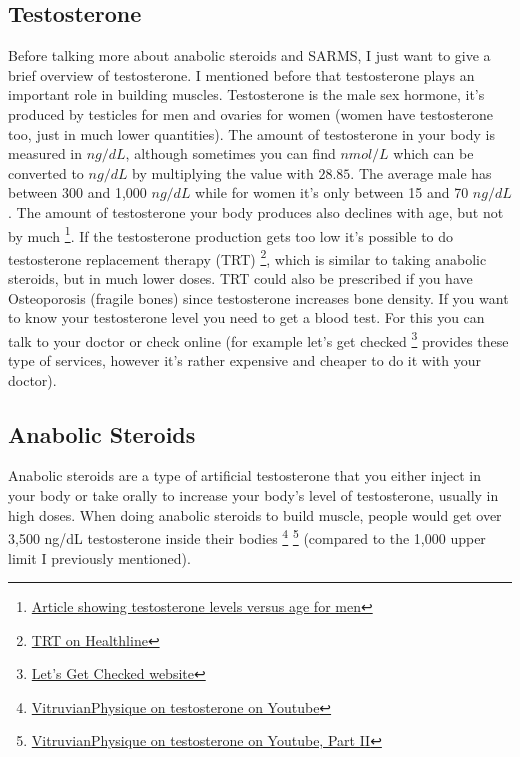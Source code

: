 \documentclass[openany, 12pt]{book}
\begin{document}
        \subsection{Testosterone}
        
        Before talking more about anabolic steroids and SARMS, I just want to give a brief overview of testosterone. I mentioned before that testosterone plays an important role in building muscles.
        Testosterone is the male sex hormone, it's produced by testicles for men and ovaries for women (women have testosterone too, just in much lower quantities).
        The amount of testosterone in your body is measured in $ng/dL$, although sometimes you can find $nmol/L$ which can be converted to $ng/dL$ by multiplying the value with $28.85$.
        The average male has between 300 and 1,000 $ng/dL$ while for women it's only between 15 and 70 $ng/dL$. The amount of testosterone your body produces also declines with age, but not by much
        \footnote{\href{https://pubmed.ncbi.nlm.nih.gov/25295520/}{Article showing testosterone levels versus age for men}}. If the testosterone production gets too low it's possible to
        do testosterone replacement therapy (TRT)
        \footnote{\href{https://www.healthline.com/health/trt/}{TRT on Healthline}}, which is similar to taking anabolic steroids, but in much lower doses. TRT could also be prescribed if
        you have Osteoporosis (fragile bones) since testosterone increases bone density.
        If you want to know your testosterone level you need to get a blood test. For this you can talk to your doctor or check online (for example let's get checked
        \footnote{\href{https://www.letsgetchecked.co.uk/}{Let's Get Checked website}}
        provides these type of services, however it's rather expensive and cheaper to do it with your doctor).

        \subsection{Anabolic Steroids}

        Anabolic steroids are a type of artificial testosterone that you either inject in your body or take orally to increase your body's level of testosterone, usually in high doses.
        When doing anabolic steroids to build muscle, people would get over 3,500 ng/dL testosterone inside their bodies
        \footnote{\href{https://www.youtube.com/watch?v=Oml-f1yUz2w}{VitruvianPhysique on testosterone on Youtube}}
        \footnote{\href{https://www.youtube.com/watch?v=UKcEHtm8MFA}{VitruvianPhysique on testosterone on Youtube, Part II}}
        (compared to the 1,000 upper limit I previously mentioned). 
\end{document}
